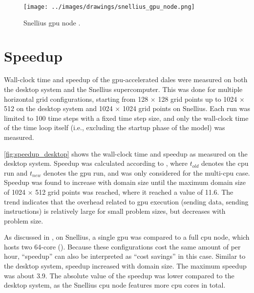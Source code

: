 \begin{figure}
    \centering
    \texttt{[image: ../images/drawings/snellius\_gpu\_node.png]}
    \caption{Snellius \acrshort{gpu} node \citep{wattsLenovoThinkSystemSD650N2024}.}
    \label{fig:gpu_node}
\end{figure}

\section{Speedup} \label{sec:speedup}
Wall-clock time and speedup of the \acrshort{gpu}-accelerated \acrshort{dales} were measured on both the desktop system and the Snellius supercomputer. This was done for multiple horizontal grid configurations, starting from 128 $\times$ 128 grid points up to 1024 $\times$ 512 on the desktop system and 1024 $\times$ 1024 grid points on Snellius. Each run was limited to 100 time steps with a fixed time step size, and only the wall-clock time of the time loop itself (i.e., excluding the startup phase of the model) was measured.

\autoref{fig:speedup_desktop} shows the wall-clock time and speedup as measured on the desktop system. Speedup was calculated according to , where $t_{old}$ denotes the \acrshort{cpu} run and $t_{new}$ denotes the \acrshort{gpu} run, and was only considered for the multi-\acrshort{cpu} case. Speedup was found to increase with domain size until the maximum domain size of 1024 $\times$ 512 grid points was reached, where it reached a value of 11.6. The trend indicates that the overhead related to \acrshort{gpu} execution (sending data, sending instructions) is relatively large for small problem sizes, but decreases with problem size.

As discussed in , on Snellius, a single \acrshort{gpu} was compared to a full \acrshort{cpu} node, which hosts two 64-core  (). Because these configurations cost the same amount of  per hour, ``speedup'' can also be interpreted as ``cost savings'' in this case. Similar to the desktop system, speedup increased with domain size. The maximum speedup was about 3.9. The absolute value of the speedup was lower compared to the desktop system, as the Snellius \acrshort{cpu} node features more \acrshort{cpu} cores in total.

